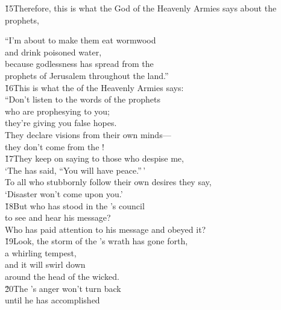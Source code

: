 \v{15}Therefore, this is what the  God of the Heavenly Armies says about the prophets,

\begin{poetry}
\poeml ``I'm about to make them eat wormwood \\
\poemll    and drink poisoned water, \\
\poeml because godlessness has spread from the \\
\poemll    prophets of Jerusalem throughout the land.'' \\
\poeml \v{16}This is what the  of the Heavenly Armies says: \\
\poeml ``Don't listen to the words of the prophets \\
\poemll    who are prophesying to you; \\
\poemlll       they're giving you false hopes. \\
\poeml They declare visions from their own minds--- \\
\poemll    they don't come from the ! \\
\poeml \v{17}They keep on saying to those who despise me, \\
\poemll    `The  has said, ``You will have peace.''\,' \\
\poeml To all who stubbornly follow their own desires they say, \\
\poemll    `Disaster won't come upon you.' \\
\poeml \v{18}But who has stood in the 's council \\
\poemll    to see and hear his message? \\
\poemlll       Who has paid attention to his message and obeyed it? \\
\poeml \v{19}Look, the storm of the 's wrath has gone forth, \\
\poemll    a whirling tempest, \\
\poeml and it will swirl down \\
\poemll    around the head of the wicked. \\
\poeml \v{20}The 's anger won't turn back \\
\poemll    until he has accomplished \\

\end{poetry}
